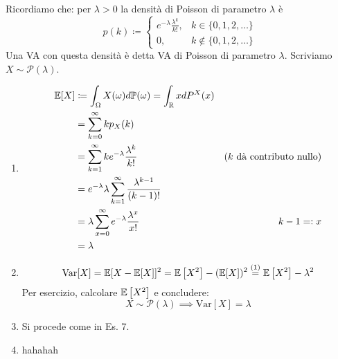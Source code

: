 \Soluzione

Ricordiamo che: per $\lambda  >0$ la densità di Poisson di parametro $\lambda $ è
\begin{equation*}
p(k) \coloneqq
\begin{cases}
e^{-\lambda }\frac{\lambda^{k}}{k!} , & k\in \{0,1,2,\dots \}\\
0, & k\notin \{0,1,2,\dots \}
\end{cases}
\end{equation*}
Una VA con questa densità è detta VA di Poisson di parametro $\lambda $. Scriviamo $X\sim \mathcal{P}(\lambda)$.
\begin{enumerate}
\item
\begin{align*}
\mathbb{E}[X] & \coloneqq \int_{\Omega } X(\omega) d\mathbb{P}(\omega) =\int_{\mathbb{R}} xdP^{X}(x) & \\
 & =\sum\limits_{k=0}^{\infty } kp_{X}(k) & \\
 & =\sum\limits_{k=1}^{\infty } ke^{-\lambda }\frac{\lambda^{k}}{k!} & \text{(} k\ \text{dà contributo nullo)}\\
 & =e^{-\lambda } \lambda \sum\limits_{k=1}^{\infty }\frac{\lambda^{k-1}}{(k-1) !} & \\
 & =\lambda \sum\limits_{x=0}^{\infty } e^{-\lambda }\frac{\lambda^{x}}{x!} & k-1=:x\\
 & =\lambda  & 
\end{align*}
\item
\begin{equation*}
\mathrm{Var}[X] =\mathbb{E}[X-\mathbb{E}[X]]^{2} =\mathbb{E}\left[X^{2}\right] -(\mathbb{E}[X])^{2}\overset{(1)}{=}\mathbb{E}\left[X^{2}\right] -\lambda^{2}
\end{equation*}
Per esercizio, calcolare $\mathbb{E}\left[X^{2}\right]$ e concludere:
\begin{equation*}
X\sim \mathcal{P}(\lambda) \implies \mathrm{Var}[X] =\lambda 
\end{equation*}
\item Si procede come in Es. 7.
\item hahahah
\end{enumerate}

\Soluzione


